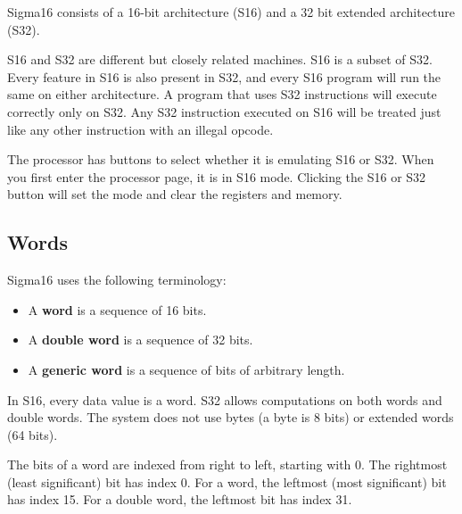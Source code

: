 \documentclass[11pt]{article}
\begin{document}
Sigma16 consists of a 16-bit architecture (S16) and a 32 bit extended
architecture (S32).

S16 and S32 are different but closely related machines.  S16 is a
subset of S32.  Every feature in S16 is also present in S32, and every
S16 program will run the same on either architecture.  A program that
uses S32 instructions will execute correctly only on S32.  Any S32
instruction executed on S16 will be treated just like any other
instruction with an illegal opcode.

The processor has buttons to select whether it is emulating S16 or
S32.  When you first enter the processor page, it is in S16 mode.
Clicking the S16 or S32 button will set the mode and clear the
registers and memory.

\subsection*{Words}
\label{sec:org55f55ce}

Sigma16 uses the following terminology:
\begin{itemize}
\item A \textbf{word} is a sequence of 16 bits.
\item A \textbf{double word} is a sequence of 32 bits.
\item A \textbf{generic word} is a sequence of bits of arbitrary length.
\end{itemize}

In S16, every data value is a word.  S32 allows computations on both
words and double words.  The system does not use bytes (a byte is 8
bits) or extended words (64 bits).

The bits of a word are indexed from right to left, starting with 0.
The rightmost (least significant) bit has index 0.  For a word, the
leftmost (most significant) bit has index 15.  For a double word, the
leftmost bit has index 31.
\end{document}

